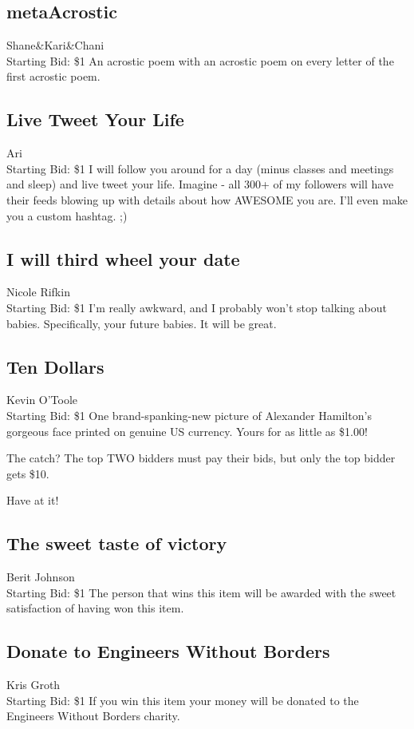 \documentclass[11pt]{article}
\begin{document}
\subsection{metaAcrostic}
Shane\&Kari\&Chani
\\
Starting Bid: \$1
\newline
An acrostic poem with an acrostic poem on every letter of the first acrostic poem.
\subsection{Live Tweet Your Life}
Ari
\\
Starting Bid: \$1
\newline
I will follow you around for a day (minus classes and meetings and sleep) and live tweet your life. Imagine - all 300+ of my followers will have their feeds blowing up with details about how AWESOME you are. I'll even make you a custom hashtag. ;)
\subsection{I will third wheel your date}
Nicole Rifkin
\\
Starting Bid: \$1
\newline
I'm really awkward, and I probably won't stop talking about babies. Specifically, your future babies. It will be great.
\subsection{Ten Dollars}
Kevin O'Toole
\\
Starting Bid: \$1
\newline
One brand-spanking-new picture of Alexander Hamilton's gorgeous face printed on genuine US currency. Yours for as little as \$1.00!

The catch? The top TWO bidders must pay their bids, but only the top bidder gets \$10.

Have at it!
\subsection{The sweet taste of victory}
Berit Johnson
\\
Starting Bid: \$1
\newline
The person that wins this item will be awarded with the sweet satisfaction of having won this item.
\subsection{Donate to Engineers Without Borders}
Kris Groth
\\
Starting Bid: \$1
\newline
If you win this item your money will be donated to the Engineers Without Borders charity.
\end{document}
